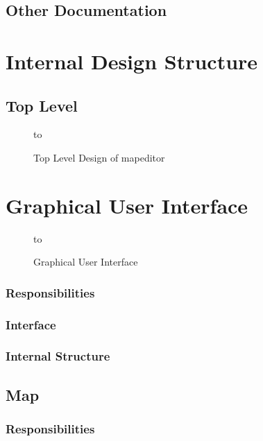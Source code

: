\section{Other Documentation}




\chapter{Internal Design Structure}


\section{Top Level}

\begin{figure}
\epsfysize=8cm
\hbox to 
\caption {Top Level Design of mapeditor}
\end{figure}

\chapter{Graphical User Interface}

\begin{figure}
\epsfysize=8cm
\hbox to 
\caption {Graphical User Interface}
\end{figure}

\subsection{Responsibilities}

\subsection{Interface}

\subsection{Internal Structure}


\section{Map}

\subsection{Responsibilities}

